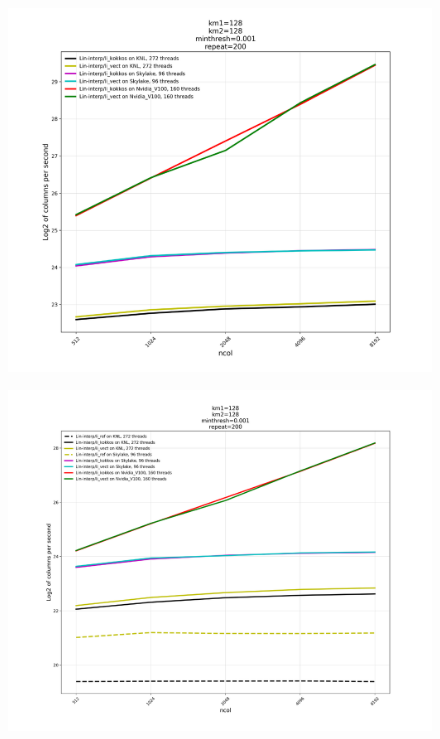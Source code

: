 \documentclass[10pt,twocolumn]{article}
\begin{document}
\begin{figure}[hbt]
  \centering
  \includegraphics[width=1.0\linewidth]{final-setup.pdf}
\end{figure}

\begin{figure}[hbt]
  \centering
  \includegraphics[width=1.0\linewidth]{final-total.pdf}
\end{figure}
\end{document}
